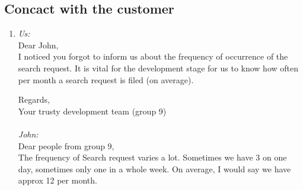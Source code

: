 \documentclass{article}
\begin{document}
\subsection*{Concact with the customer}
\begin{enumerate}[1.]
	\item \label{conv1}\textsl{Us:}\\
	Dear John,\\

I noticed you forgot to inform us about the frequency of occurrence of the search request. It is vital for the development stage for us to know how often per month a search request is filed (on average).

Regards,\\
Your trusty development team (group 9)\\
\vspace{10pt}\\
\textsl{John:}\\
Dear people from group 9,\\

The frequency of Search request varies a lot. Sometimes we have 3 on one day, sometimes only one in a whole week. On average, I would say we have approx 12 per month.
\end{enumerate}
\end{document}
